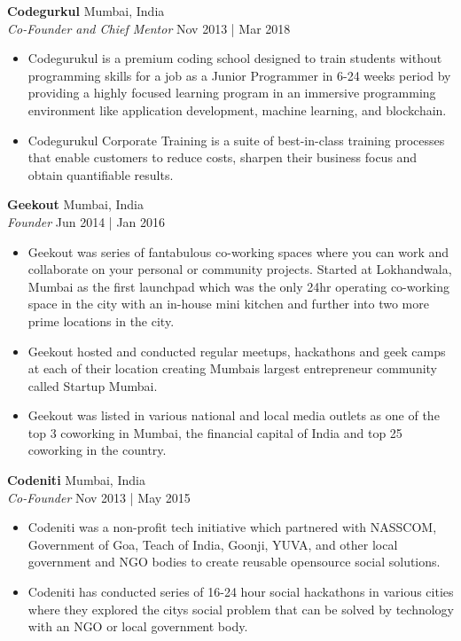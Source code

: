 \documentclass[a4paper]{article}
\begin{document}
\textbf{Codegurkul} \hfill Mumbai, India\\
\textit{Co-Founder and Chief Mentor} \hfill Nov 2013 | Mar 2018\\
\vspace{-1mm}
\begin{itemize} \itemsep 1pt
	\item Codegurukul is a premium coding school designed to train students without programming skills for a job as a Junior Programmer in 6-24 weeks period by providing a highly focused learning program in an immersive programming environment like application development, machine learning, and blockchain.
	\item Codegurukul Corporate Training is a suite of best-in-class training processes that enable customers to reduce costs, sharpen their business focus and obtain quantifiable results.
\end{itemize}
\textbf{Geekout} \hfill Mumbai, India\\
\textit{Founder} \hfill Jun 2014 | Jan 2016\\
\vspace{-1mm}
\begin{itemize} \itemsep 1pt
	\item Geekout was series of fantabulous co-working spaces where you can work and collaborate on your personal or community projects. Started at Lokhandwala, Mumbai as the first launchpad which was the only 24hr operating co-working space in the city with an in-house mini kitchen and further into two more prime locations in the city.
	\item Geekout hosted and conducted regular meetups, hackathons and geek camps at each of their location creating Mumbai\textquotesingle{}s largest entrepreneur community called Startup Mumbai.
	\item Geekout was listed in various national and local media outlets as one of the top 3 coworking in Mumbai, the financial capital of India and top 25 coworking in the country.
\end{itemize}
\textbf{Codeniti} \hfill Mumbai, India\\
\textit{Co-Founder} \hfill Nov 2013 | May 2015\\
\vspace{-1mm}
\begin{itemize} \itemsep 1pt
	\item Codeniti was a non-profit tech initiative which partnered with NASSCOM, Government of Goa, Teach of India, Goonji, YUVA, and other local government and NGO bodies to create reusable opensource social solutions.
	\item Codeniti has conducted series of 16-24 hour social hackathons in various cities where they explored the city\textquotesingle{}s social problem that can be solved by technology with an NGO or local government body.
\end{itemize}
\end{document}
